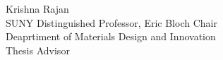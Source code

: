 Krishna Rajan\\
SUNY Distinguished Professor, Eric Bloch Chair\\
Deaprtiment of Materials Design and Innovation \\
Thesis Advisor \\
